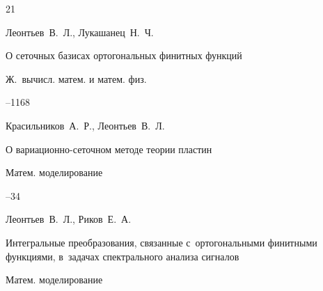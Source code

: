 \begin{thebibliography}{21}








\by Леонтьев~В.~Л., Лукашанец~Н.~Ч.

\paper О сеточных базисах ортогональных финитных функций

\jour Ж.~вычисл. матем. и матем. физ.




--1168















\by Красильников~А.~Р., Леонтьев~В.~Л.

\paper О вариационно-сеточном методе теории пластин

\jour Матем. моделирование




--34






\by Леонтьев~В.~Л., Риков~Е.~А.

\paper Интегральные преобразования, связанные с~ортогональными финитными функциями, в~задачах спектрального анализа сигналов

\jour Матем. моделирование


\end{thebibliography}
